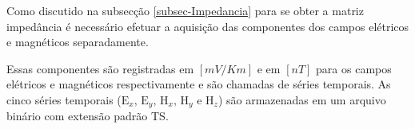         \begin{table}[H]
                \centering
                \caption{Taxas de Aquisições frequentemente usadas para equipamentos ADU06 e ADU07.}
                \label{tab_taxa_aquisicao}
            \end{table}
        
        Como discutido na subsecção \ref{subsec-Impedancia} para se obter a matriz impedância é necessário efetuar a aquisição das componentes dos campos elétricos e magnéticos separadamente.
        
        Essas componentes são registradas em $[mV/Km]$ e em $[nT]$ para os campos elétricos e magnéticos respectivamente e são chamadas de séries temporais. As cinco séries temporais ($\textrm{E}_x,\, \textrm{E}_y, \, \textrm{H}_x, \, \textrm{H}_y \, \, \textrm{e} \, \, \textrm{H}_z$) são armazenadas em um arquivo binário com extensão padrão TS.
        
